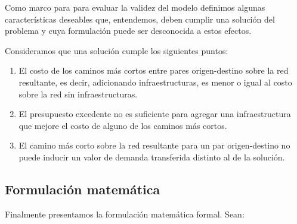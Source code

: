 \documentclass{article}
\begin{document}
  Como marco para para evaluar la validez del modelo definimos algunas características deseables que, entendemos, deben cumplir una solución del problema y cuya formulación puede ser desconocida a estos efectos.

  Consideramos que una solución cumple los siguientes puntos:

  \begin{enumerate}
      \item{El costo de los caminos más cortos entre pares origen-destino sobre la red resultante, es decir, adicionando infraestructuras, es menor o igual al costo sobre la red sin infraestructuras.}
    \item{\label{budgetexcess} El presupuesto excedente no es suficiente para agregar una infraestructura que mejore el costo de alguno de los caminos más cortos.}
    \item{El camino más corto sobre la red resultante para un par origen-destino no puede inducir un valor de demanda transferida distinto al de la solución.}
  \end{enumerate}

  \subsection{Formulación matemática}

  Finalmente presentamos la formulación matemática formal. Sean:
\end{document}
